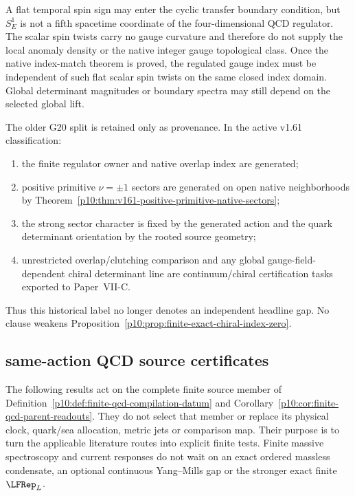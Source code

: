 \documentclass[12pt,a4paper]{article}
\begin{document}
\begin{remark}
\label{p10:rem:v190-scalar-spin-g20-firewall}
A flat temporal spin sign may enter the cyclic transfer boundary condition, but
$S_E^1$ is not a fifth spacetime coordinate of the four-dimensional QCD
regulator.  The scalar spin twists carry no gauge curvature and therefore do
not supply the local anomaly density or the native integer gauge topological
class.  Once the native index-match theorem is proved, the regulated gauge
index must be independent of such flat scalar spin twists on the same closed
index domain.  Global determinant magnitudes or boundary spectra may still
depend on the selected global lift.
\end{remark}

\begin{definition}
\label{p10:def:v186-g20-layer-split}
The older G20 split is retained only as provenance.  In the active v1.61
classification:
\begin{enumerate}[label=\textnormal{(\Alph*)},leftmargin=3.8em]
\item the finite regulator owner and native overlap index are generated;
\item positive primitive \(\nu=\pm1\) sectors are generated on open native
      neighborhoods by Theorem~\ref{p10:thm:v161-positive-primitive-native-sectors};
\item the strong sector character is fixed by the generated action and the
      quark determinant orientation by the rooted source geometry;
\item unrestricted overlap/clutching comparison and any global
      gauge-field-dependent chiral determinant line are continuum/chiral
      certification tasks exported to Paper~VII-C.
\end{enumerate}
Thus this historical label no longer denotes an independent headline gap.
No clause weakens Proposition~\ref{p10:prop:finite-exact-chiral-index-zero}.
\end{definition}




\subsection{same-action QCD source certificates}
\label{p10:sec:v2210-lit-source-certificates}
The following results act on the complete finite source member of
Definition~\ref{p10:def:finite-qcd-compilation-datum} and
Corollary~\ref{p10:cor:finite-qcd-parent-readouts}. They do not select that
member or replace its physical clock, quark/sea allocation, metric jets or
comparison map. Their purpose is to turn the applicable literature routes
into explicit finite tests. Finite massive spectroscopy and current
responses do not wait on an exact ordered massless condensate, an optional
continuous Yang--Mills gap or the stronger exact finite $\LFRep_L$.
\end{document}
